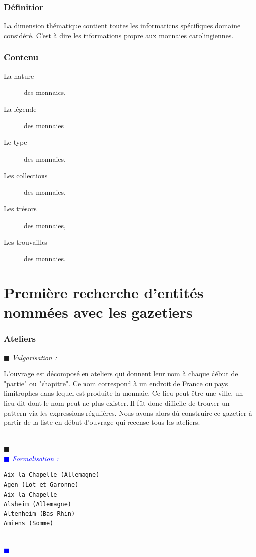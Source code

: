 \documentclass[a4paper, 11pt]{report}
\newenvironment{vulgarisation}
    {
    \textit{\textcolor{dark-blue}{$\blacksquare$  Vulgarisation : \\}}

    }
    {
    ~\\\textcolor{dark-blue}{$\blacksquare$}\\
    }
\newenvironment{formalisation}
    {
    \textit{\textcolor{blue}{$\blacksquare$  Formalisation : \\}}
    }
    {
    ~\\\textcolor{blue}{$\blacksquare$}\\
    }
\begin{document}
	    \subsubsection{Définition}
    La dimension thématique contient toutes les informations spécifiques domaine considéré.  C'est à dire les informations propre aux monnaies carolingiennes.
    \subsubsection{Contenu}	
    \begin{description}
    \item[La nature] des monnaies,
    \item[La légende] des monnaies
    \item[Le type] des monnaies,
    \item[Les collections] des monnaies,
    \item[Les trésors] des monnaies,
    \item[Les trouvailles] des monnaies.
    \end{description}
    
    
	\section{Première recherche d'entités nommées avec les gazetiers}
	\subsubsection{Ateliers}
\begin{vulgarisation}
	L'ouvrage est décomposé en ateliers qui donnent leur nom à chaque début de "partie" ou "chapitre". Ce nom correspond à un endroit de France ou pays limitrophes dans lequel est produite la monnaie. Ce lieu peut être une ville, un lieu-dit dont le nom peut ne plus exister. Il fût donc difficile de trouver un pattern via les expressions régulières. Nous avons alors dû construire ce gazetier à partir de la liste en début d'ouvrage qui recense tous les ateliers.
\end{vulgarisation}
\begin{formalisation}
\begin{verbatim}
Aix-la-Chapelle (Allemagne)
Agen (Lot-et-Garonne)
Aix-la-Chapelle
Alsheim (Allemagne)
Altenheim (Bas-Rhin)
Amiens (Somme)
\end{verbatim}
\end{formalisation}
\end{document}

